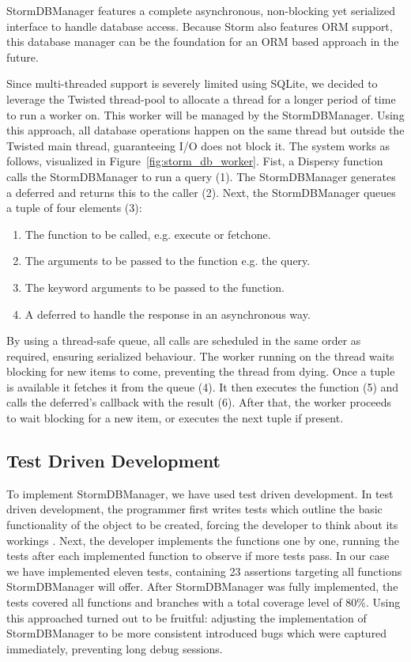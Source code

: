 StormDBManager features a complete asynchronous, non-blocking yet serialized interface to handle database access.
Because Storm also features ORM support, this database manager can be the foundation for an ORM based approach in the future.

Since multi-threaded support is severely limited using SQLite, we decided to leverage the Twisted thread-pool to allocate a thread for a longer period of time to run a worker on.
This worker will be managed by the StormDBManager.
Using this approach, all database operations happen on the same thread but outside the Twisted main thread, guaranteeing I/O does not block it.
The system works as follows, visualized in Figure~\ref{fig:storm_db_worker}.
Fist, a Dispersy function calls the StormDBManager to run a query (1).
The StormDBManager generates a deferred and returns this to the caller (2).
Next, the StormDBManager queues a tuple of four elements (3):

\begin{enumerate}
	\item The function to be called, e.g. execute or fetchone.
	\item The arguments to be passed to the function e.g. the query.
	\item The keyword arguments to be passed to the function.
	\item A deferred to handle the response in an asynchronous way.
\end{enumerate}

By using a thread-safe queue, all calls are scheduled in the same order as required, ensuring serialized behaviour.
The worker running on the thread waits blocking for new items to come, preventing the thread from dying.
Once a tuple is available it fetches it from the queue (4).
It then executes the function (5) and calls the deferred's callback with the result (6).
After that, the worker proceeds to wait blocking for a new item, or executes the next tuple if present.

\subsection{Test Driven Development}
To implement StormDBManager, we have used test driven development.
In test driven development, the programmer first writes tests which outline the basic functionality of the object to be created, forcing the developer to think about its workings \cite{janzen2005test}.
Next, the developer implements the functions one by one, running the tests after each implemented function to observe if more tests pass.
In our case we have implemented eleven tests, containing 23 assertions targeting all functions StormDBManager will offer.
After StormDBManager was fully implemented, the tests covered all functions and branches with a total coverage level of 80\%.
Using this approached turned out to be fruitful: adjusting the implementation of StormDBManager to be more consistent introduced bugs which were captured immediately, preventing long debug sessions.

